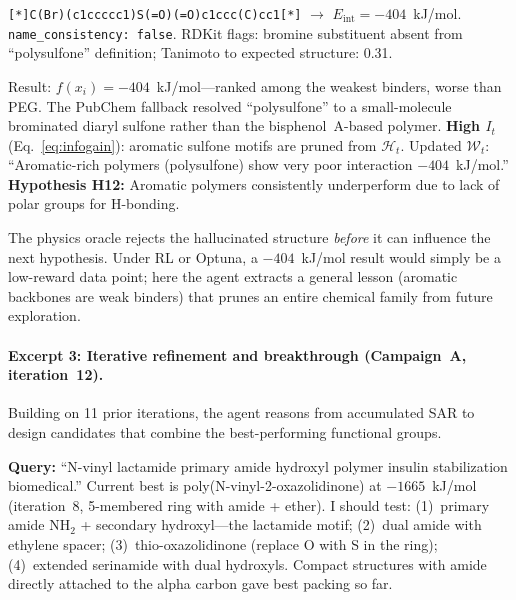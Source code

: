 \documentclass[twocolumn]{fairmeta}
\begin{document}
\begin{toolcall}
\scriptsize
\texttt{[*]C(Br)(c1ccccc1)S(=O)(=O)c1ccc(C)cc1[*]} $\to$ $E_\text{int} = -404$~kJ/mol.
\texttt{name\_consistency: false}. RDKit flags: bromine substituent absent from ``polysulfone'' definition; Tanimoto to expected structure: 0.31.
\end{toolcall}

\begin{observation}
\scriptsize
Result: $f(x_i) = -404$~kJ/mol---ranked among the weakest binders, worse than PEG.
The PubChem fallback resolved ``polysulfone'' to a small-molecule brominated diaryl sulfone rather than the bisphenol~A-based polymer.
\textbf{High $I_t$} (Eq.~\ref{eq:infogain}): aromatic sulfone motifs are pruned from $\mathcal{H}_t$.
Updated $\mathcal{W}_t$: ``Aromatic-rich polymers (polysulfone) show very poor interaction $-404$~kJ/mol.''
\textbf{Hypothesis H12:} Aromatic polymers consistently underperform due to lack of polar groups for H-bonding.
\end{observation}

\noindent The physics oracle rejects the hallucinated structure \emph{before} it can influence the next hypothesis.
Under RL or Optuna, a $-404$~kJ/mol result would simply be a low-reward data point; here the agent extracts a general lesson (aromatic backbones are weak binders) that prunes an entire chemical family from future exploration.

\paragraph{Excerpt 3: Iterative refinement and breakthrough (Campaign~A, iteration~12).}
Building on 11 prior iterations, the agent reasons from accumulated SAR to design candidates that combine the best-performing functional groups.

\begin{agentthought}
\scriptsize
\textbf{Query:} ``N-vinyl lactamide primary amide hydroxyl polymer insulin stabilization biomedical.''
Current best is poly(N-vinyl-2-oxazolidinone) at $-1665$~kJ/mol (iteration~8, 5-membered ring with amide + ether).
I should test: (1)~primary amide NH$_2$ + secondary hydroxyl---the lactamide motif; (2)~dual amide with ethylene spacer; (3)~thio-oxazolidinone (replace O with S in the ring); (4)~extended serinamide with dual hydroxyls.
Compact structures with amide directly attached to the alpha carbon gave best packing so far.
\end{agentthought}
\end{document}
